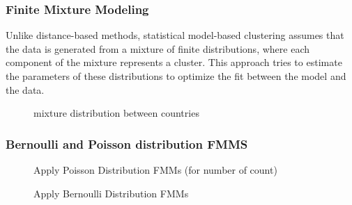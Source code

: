 \documentclass[xcolor=svgnames]{beamer}
\begin{document}

\begin{frame}\frametitle{Finite Mixture Modeling}

  Unlike distance-based methods, statistical model-based clustering assumes that the data is generated from a mixture of finite distributions, where each component of the mixture represents a cluster. This approach tries to estimate the parameters of these distributions to optimize the fit between the model and the data.
  
  \begin{figure}
    \centering
    \caption{mixture distribution between countries~\cite{shetty1994body}}
  \end{figure}
  
\end{frame}


\begin{frame}\frametitle{Bernoulli and Poisson distribution FMMS}

  \begin{figure}
    \centering
    \begin{minipage}{.48\linewidth}
      \centering
      \caption{Apply Poisson  Distribution FMMs (for number of count)}
    \end{minipage}\hfill
    \begin{minipage}{.48\linewidth}
      \centering
      \caption{Apply Bernoulli Distribution FMMs}
    \end{minipage}
  \end{figure}
  
\end{frame}

\end{document}
